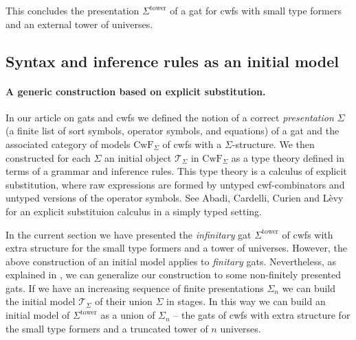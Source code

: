 \documentclass[submission,copyright,creativecommons]{eptcs}
\newcommand{\T}{\mathsf{T}}
\def\T{\mathcal{T}}
\def\CwF{\mathrm{CwF}}
\def\Sigmaext{{\Sigma^\mathrm{tower}}}
\begin{document}
This concludes the presentation $\Sigmaext$ of a gat for cwfs with small type formers and an external tower of universes.

\subsection{Syntax and inference rules as an initial model}\label{initiality-external}

\paragraph{A generic construction based on explicit substitution.} In our article  \cite{bezem:hofmann} on gats and cwfs we defined the notion of a correct {\em presentation} $\Sigma$ (a finite list of sort symbols, operator symbols, and equations) of a gat and the associated category of models $\CwF_\Sigma$ of cwfs with a $\Sigma$-structure. We then constructed for each $\Sigma$ an initial object $\T_\Sigma$ in $\CwF_\Sigma$ as a type theory defined in terms of a grammar and inference rules. This type theory is a calculus of explicit substitution, where raw expressions are formed by untyped cwf-combinators and untyped versions of the operator symbols. See Abadi, Cardelli, Curien and L\`evy \cite{AbadiCCL90} for an explicit substituion calculus in a simply typed setting.

In the current section we have presented the {\em infinitary} gat $\Sigmaext$ of cwfs with extra structure for the small type formers and a tower of universes. However, the above construction of an initial model applies to {\em finitary} gats. Nevertheless, as explained in \cite[Section 5.7]{bezem:hofmann}, we can generalize our construction to some non-finitely presented gats. If we have an increasing sequence of finite presentations $\Sigma_n$ we can build the initial model $\T_\Sigma$ of their union $\Sigma$ in stages. In this way we can build an initial model of $\Sigmaext$ as a union of $\Sigma_n$ -- the gats of cwfs with extra structure for the small type formers and a truncated tower of $n$ universes.
\end{document}
